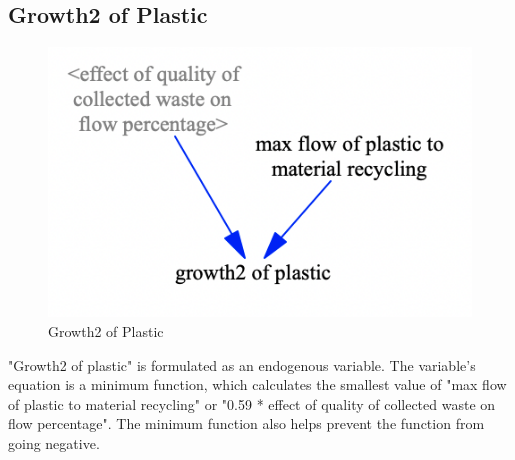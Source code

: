 \subsection{Growth2 of Plastic}

\begin{figure}[H]
\centering
\includegraphics [scale=0.34,angle=360]{figures/plasticgrowth.png}
\caption{Growth2 of Plastic}
\label{fig:plasticgrowth}
\end{figure}

\indent \newline
"Growth2 of plastic" is formulated as an endogenous variable. The variable's equation is a minimum function, which calculates the smallest value of "max flow of plastic to material recycling" or "0.59 * effect of quality of collected waste on flow percentage". The minimum function also helps prevent the function from going negative.



